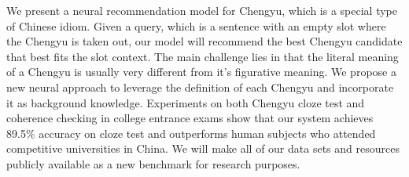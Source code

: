 We present a neural recommendation model for Chengyu, which is a special type of Chinese idiom. Given a query, which is a sentence with an empty slot where the Chengyu is taken out, our model will recommend the best Chengyu candidate that best fits the slot context. The main challenge lies in that the literal meaning of a Chengyu is usually very different from it's figurative meaning. We propose a new neural approach to leverage the definition of each Chengyu and incorporate it as background knowledge. Experiments on both Chengyu cloze test and coherence checking in college entrance exams show that our system achieves 89.5\% accuracy on cloze test and outperforms human subjects who attended competitive universities in China. We will make all of our data sets and resources publicly available as a new benchmark for research purposes.
